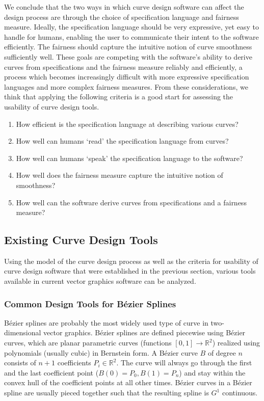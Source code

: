 \documentclass[a4paper]{article}
\begin{document}
			We conclude that the two ways in which curve design software can affect the design process are through the choice of specification language and fairness measure. Ideally, the specification language should be very expressive, yet easy to handle for humans, enabling the user to communicate their intent to the software efficiently. The fairness should capture the intuitive notion of curve smoothness sufficiently well. These goals are competing with the software's ability to derive curves from specifications and the fairness measure reliably and efficiently, a process which becomes increasingly difficult with more expressive specification languages and more complex fairness measures. From these considerations, we think that applying the following criteria is a good start for assessing the usability of curve design tools.

			\begin{enumerate}
				\item How efficient is the specification language at describing various curves?
				\item How well can humans `read' the specification language from curves?
				\item How well can humans `speak' the specification language to the software?
				\item How well does the fairness measure capture the intuitive notion of smoothness?
				\item How well can the software derive curves from specifications and a fairness measure?
			\end{enumerate}

		\subsection{Existing Curve Design Tools}
		\label{section:existing_curve_design_tools}

			Using the model of the curve design process as well as the criteria for usability of curve design software that were established in the previous section, various tools available in current vector graphics software can be analyzed.

			\subsubsection{Common Design Tools for Bézier Splines}
			\label{section:common_design_tools_bézier_splines}

				Bézier splines are probably the most widely used type of curve in two-dimensional vector graphics. Bézier splines are defined piecewise using Bézier curves, which are planar parametric curves (functions \(\left[0,1\right] \rightarrow \mathbb{R}^2\)) realized using polynomials (usually cubic) in Bernstein form. A Bézier curve \(B\) of degree \(n\) consists of \(n + 1\) coefficients \(P_i \in \mathbb{R}^2\). The curve will always go through the first and the last coefficient point (\(B\left(0\right) = P_0, B\left(1\right) = P_n\)) and stay within the convex hull of the coefficient points at all other times. Bézier curves in a Bézier spline are usually pieced together such that the resulting spline is \(G^1\) continuous.
\end{document}
